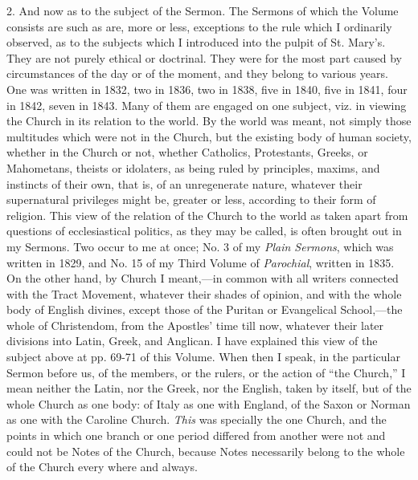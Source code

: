 2. And now as to the subject of the Sermon. The Sermons of which the Volume consists are such as are, more or
less, exceptions to the rule which I ordinarily observed, as to the
subjects which I introduced into the pulpit of St. Mary's. They are not
purely ethical or doctrinal. They were for the most part caused by
circumstances of the day or of the moment, and they belong to various years. One was written in 1832, two
in 1836, two in 1838, five in 1840, five in 1841, four in 1842, seven in
1843. Many of them are engaged on one subject, viz. in viewing the
Church in its relation to the world. By the world was meant, not simply
those multitudes which were not in the Church, but the existing body of
human society, whether in the Church or not, whether Catholics,
Protestants, Greeks, or Mahometans, theists or idolaters, as being ruled
by principles, maxims, and instincts of their own, that is, of an
unregenerate nature, whatever their supernatural privileges might be,
greater or less, according to their form of religion. This view of the
relation of the Church to the world as taken apart from questions of
ecclesiastical politics, as they may be called, is often brought out in
my Sermons. Two occur to me at once; No. 3 of my \emph{Plain Sermons}, which
was written in 1829, and No. 15 of my Third Volume of \emph{Parochial},
written in 1835. On the other hand, by Church I meant,—in
common with all writers connected with the Tract Movement, whatever
their shades of opinion, and with the whole body of English divines,
except those of the Puritan or Evangelical School,—the whole of
Christendom, from the Apostles' time till now, whatever their later
divisions into Latin, Greek, and Anglican. I have explained this view of
the subject above at pp. 69-71 of this Volume. When then I speak, in
the particular Sermon before us, of the members, or the rulers, or the
action of ``the Church,'' I mean neither the Latin, nor the
Greek, nor the English, taken by itself, but of the whole Church as one
body: of Italy as one with England, of the Saxon or Norman as one with
the Caroline Church. \emph{This} was specially the one Church, and the
points in which one branch or one period differed from another were not
and could not be Notes of the Church, because Notes necessarily belong to the whole of the Church every where and always.

